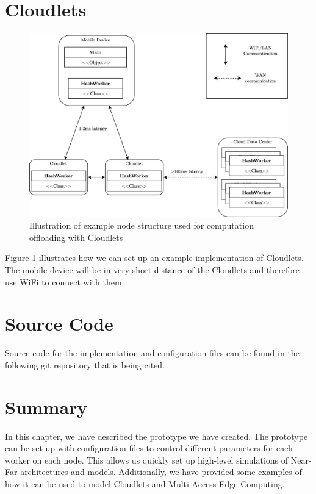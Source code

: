 
\section{Cloudlets}
\begin{figure}[t]
    \centering
    \includegraphics[scale=0.9]{chapters/5_implementation/figures/Cloudlet_implementation.png}
    \caption{Illustration of example node structure used for computation offloading with Cloudlets}
    \label{fig:Cloudlet_implementation}
\end{figure}
Figure \ref{fig:Cloudlet_implementation} illustrates how we can set up an example implementation of Cloudlets. The mobile device will be in very short distance of the Cloudlets and therefore use WiFi to connect with them.






\section{Source Code}
Source code for the implementation and configuration files can be found in the following git repository that is being cited\cite{johnsen_daniejohmasterprograms_nodate}.






\section{Summary}
In this chapter, we have described the prototype we have created. The prototype can be set up with configuration files to control different parameters for each worker on each node. This allows us quickly set up high-level simulations of Near-Far architectures and models. Additionally, we have provided some examples of how it can be used to model Cloudlets and Multi-Access Edge Computing.